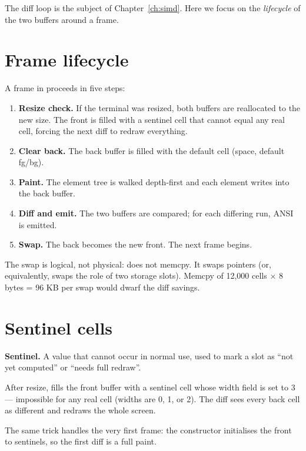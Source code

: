 The diff loop is the subject of Chapter~\ref{ch:simd}. Here we focus on
the \emph{lifecycle} of the two buffers around a frame.

\section{Frame lifecycle}

A frame in \maya{} proceeds in five steps:

\begin{enumerate}[leftmargin=*]
  \item \textbf{Resize check.} If the terminal was resized, both
    buffers are reallocated to the new size. The front is filled
    with a sentinel cell that cannot equal any real cell, forcing
    the next diff to redraw everything.
  \item \textbf{Clear back.} The back buffer is filled with the
    default cell (space, default fg/bg).
  \item \textbf{Paint.} The element tree is walked depth-first and
    each element writes into the back buffer.
  \item \textbf{Diff and emit.} The two buffers are compared; for
    each differing run, ANSI is emitted.
  \item \textbf{Swap.} The back becomes the new front. The next
    frame begins.
\end{enumerate}

The swap is logical, not physical: \maya{} does not memcpy. It
swaps pointers (or, equivalently, swaps the role of two storage
slots). Memcpy of 12,000 cells $\times$ 8 bytes = 96 KB per swap
would dwarf the diff savings.

\section{Sentinel cells}

\begin{idea}
\textbf{Sentinel.} A value that cannot occur in normal use, used
to mark a slot as ``not yet computed'' or ``needs full redraw''.
\end{idea}

After resize, \maya{} fills the front buffer with a sentinel cell
whose width field is set to 3 --- impossible for any real cell
(widths are 0, 1, or 2). The diff sees every back cell as different
and redraws the whole screen.

The same trick handles the very first frame: the constructor
initialises the front to sentinels, so the first diff is a full
paint.


